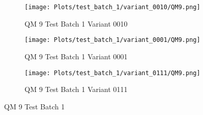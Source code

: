 \documentclass{DissertateFigs}
\begin{document}
\begin{figure}[t!]
\medskip

    \begin{subfigure}{0.47\textwidth}
    \texttt{[image: Plots/test\_batch\_1/variant\_0010/QM9.png]}
    \caption{QM 9 Test Batch 1 Variant 0010}
    \end{subfigure}
    \begin{subfigure}{0.47\textwidth}
    \texttt{[image: Plots/test\_batch\_1/variant\_0001/QM9.png]}
    \caption{QM 9 Test Batch 1 Variant 0001}
    \end{subfigure}

\medskip

    \begin{subfigure}{0.47\textwidth}
    \texttt{[image: Plots/test\_batch\_1/variant\_0111/QM9.png]}
    \caption{QM 9 Test Batch 1 Variant 0111}
    \end{subfigure}
\caption{QM 9 Test Batch 1}
    \end{figure}
\clearpage
\end{document}
